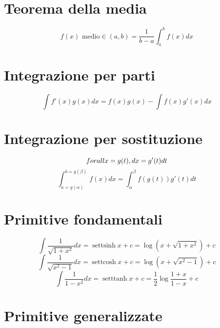 \documentclass[a4paper,12pt]{report}
\theoremstyle{mystyle}
\begin{document}
\section{Teorema della media}
\[f(x) \text{ medio} \in (a,b) = \frac{1}{b-a} \int_a^b f(x) dx\]

\section{Integrazione per parti}
\[\int f'(x) g(x) dx = f(x)g(x) - \int f(x) g'(x) dx\]

\section{Integrazione per sostituzione}
\[\\forall x = g(t), dx = g'(t) dt\]
\[\int_{a=g(\alpha)}^{b=g(\beta)} f(x) dx = \int_\alpha^\beta f(g(t)) g'(t) dt \]


\section{Primitive fondamentali}
\[\int \frac{1}{\sqrt{1 + x^2}} dx = \operatorname{settsinh} x + c= \log (x + \sqrt{1 + x^2}) + c \]
\[\int \frac{1}{\sqrt{x^2 - 1}} dx = \operatorname{settcosh} x + c = \log (x + \sqrt{x^2 - 1}) + c \]
\[\int \frac{1}{1 - x^2} dx = \operatorname{setttanh} x + c = \frac{1}{2} \log \frac{1 + x}{1 - x} + c \]

\section{Primitive generalizzate}
\end{document}
